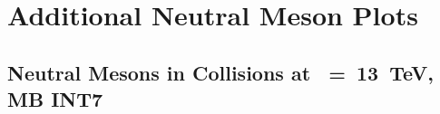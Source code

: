 \section{Additional Neutral Meson Plots}
\label{chap:AppNeutralMeson}



\subsection{\texorpdfstring{Neutral Mesons in \pp Collisions at \s~=~13~TeV, MB INT7}{Neutral Mesons in pp Collisions at 13 TeV, MB INT7}}


